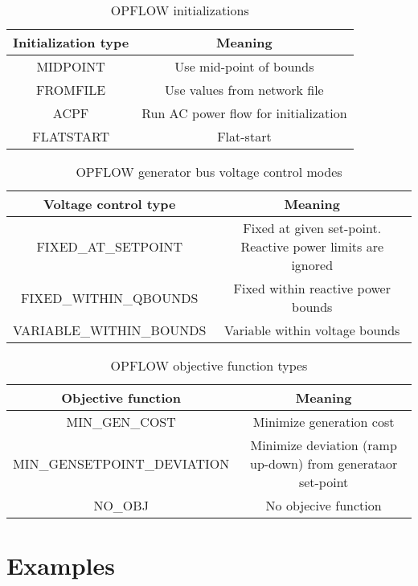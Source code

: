 \begin{table}[!htbp]
  \centering
  \caption{OPFLOW initializations}
  \begin{tabular}{|c|c|}
    \hline
    \textbf{Initialization type} & \textbf{Meaning} \\ \hline
    MIDPOINT & Use mid-point of bounds \\ \hline
    FROMFILE & Use values from network file \\ \hline
    ACPF & Run AC power flow for initialization \\ \hline
    FLATSTART & Flat-start \\ \hline
  \end{tabular}
\label{tab:opflow_initializations}
\end{table}

\begin{table}[!htbp]
  \centering
  \caption{OPFLOW generator bus voltage control modes}
  \begin{tabular}{|c|c|}
    \hline
    \textbf{Voltage control type} & \textbf{Meaning} \\ \hline
    FIXED\_AT\_SETPOINT & Fixed at given set-point. Reactive power limits are ignored \\ \hline
    FIXED\_WITHIN\_QBOUNDS & Fixed within reactive power bounds \\ \hline
    VARIABLE\_WITHIN\_BOUNDS & Variable within voltage bounds \\ \hline
  \end{tabular}
\label{tab:opflow_genbusvoltage}
\end{table}

\begin{table}[!htbp]
  \centering
  \caption{OPFLOW objective function types}
  \begin{tabular}{|c|c|}
    \hline
    \textbf{Objective function} & \textbf{Meaning} \\ \hline
    MIN\_GEN\_COST & Minimize generation cost \\ \hline
    MIN\_GENSETPOINT\_DEVIATION & Minimize deviation (ramp up-down) from generataor set-point \\ \hline
    NO\_OBJ & No objecive function \\ \hline
  \end{tabular}
\label{tab:opflow_objtypes}
\end{table}


\section{Examples}
\todo
